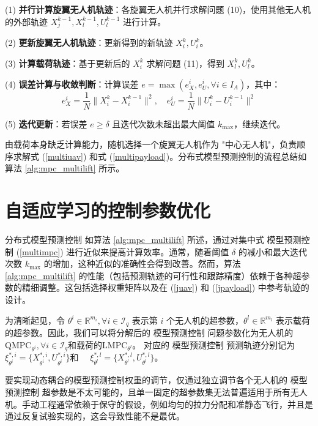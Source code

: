 \documentclass[lang=chs, degree=master, blindreview=false, winfonts=true]{yanputhesis}
\begin{document}
(1) \textbf{并行计算旋翼无人机轨迹}：各旋翼无人机并行求解问题 (10)，使用其他无人机的外部轨迹 $X_j^{k-1}, X_l^{k-1}, U_l^{k-1}$ 进行计算。

(2) \textbf{更新旋翼无人机轨迹}：更新得到的新轨迹 $X_i^k, U_i^k$。

(3) \textbf{计算载荷轨迹}：基于更新后的 $X_i^k$ 求解问题 (11)，得到 $X_l^k, U_l^k$。

(4) \textbf{误差计算与收敛判断}：计算误差 $e = \max(e_X^i, e_U^i, \forall i \in I_A)$，其中：
    \begin{equation}
        e_X^i = \frac{1}{N} \|X_i^k - X_i^{k-1}\|^2, \quad e_U^i = \frac{1}{N} \|U_i^k - U_i^{k-1}\|^2
    \end{equation}

(5) \textbf{迭代更新}：若误差 $e \geq \delta$ 且迭代次数未超出最大阈值 $k_{\text{max}}$，继续迭代。


由载荷本身缺乏计算能力，随机选择一个旋翼无人机作为 "中心无人机"，负责顺序求解式 (\ref{multiuav}) 和式 (\ref{multipayload})。分布式模型预测控制的流程总结如算法 \ref{alg:mpc_multilift} 所示。

\section{自适应学习的控制参数优化}

分布式模型预测控制 如算法 \ref{alg:mpc_multilift} 所述，通过对集中式 模型预测控制 (\ref{multimpc}) 进行近似来提高计算效率。通常，随着阈值 \(\delta\) 的减小和最大迭代次数 \(k_{\text{max}}\) 的增加，这种近似的准确性会得到改善。然而，算法 \ref{alg:mpc_multilift} 的性能（包括预测轨迹的可行性和跟踪精度）依赖于各种超参数的精细调整。这包括选择权重矩阵以及在 (\ref{juav}) 和 (\ref{jpayload}) 中参考轨迹的设计。

为清晰起见，令 \(\theta^i \in \mathbb{R}^{m_i}, \forall i \in \mathcal{I}_q\) 表示第 \(i\) 个无人机的超参数，\(\theta^l \in \mathbb{R}^{m_l}\) 表示载荷的超参数。因此，我们可以将分解后的 模型预测控制 问题参数化为无人机的
$\text{QMPC}_{\theta^i}, \forall i \in \mathcal{I}_q$和载荷的$\text{LMPC}_{\theta^l}$。
对应的 模型预测控制 预测轨迹分别记为
$\xi^{*,i}_{\theta^i} = \{ X^{*,i}_{\theta^i}, U^{*,i}_{\theta^i} \}$和
$\quad \xi^{*,l}_{\theta^l} = \{ X^{*,l}_{\theta^l}, U^{*,l}_{\theta^l} \}$。

要实现动态耦合的模型预测控制权重的调节，仅通过独立调节各个无人机的 模型预测控制 超参数是不太可能的，且单一固定的超参数集无法普遍适用于所有无人机。手动工程通常依赖于保守的假设，例如均匀的拉力分配和准静态飞行，并且是通过反复试验实现的，这会导致性能不是最优。
\end{document}
